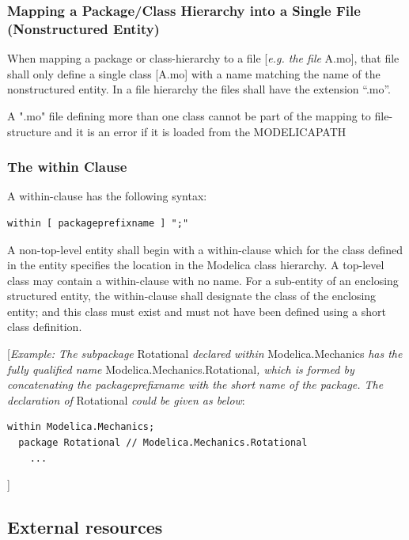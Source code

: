 \documentclass[10pt,a4paper]{report}
\def\doublelabel#1{\label{#1}\hypertarget{#1}{}}
\begin{document}
\subsubsection{Mapping a Package/Class Hierarchy into a Single File (Nonstructured Entity)}\doublelabel{mapping-a-package-class-hierarchy-into-a-single-file-nonstructured-entity}

When mapping a package or class-hierarchy to a file {[}\emph{e.g. the
  file} A.mo{]}, that file shall only define a single class {[}A.mo{]} with a
name matching the name of the nonstructured entity. In a file hierarchy
the files shall have the extension ``.mo''.

A ".mo" file defining more than one class cannot be part of the mapping
to file-structure and it is an error if it is loaded from the
MODELICAPATH

\subsubsection{The within Clause}\doublelabel{the-within-clause}

A within-clause has the following syntax:

\begin{lstlisting}[language=grammar]
  within [ packageprefixname ] ";"
\end{lstlisting}
  A non-top-level entity shall begin with a within-clause which for the
  class defined in the entity specifies the location in the Modelica class
    hierarchy. A top-level class may contain a within-clause with no name.
    For a sub-entity of an enclosing structured entity, the within-clause
shall designate the class of the enclosing entity; and this class must
exist and must not have been defined using a short class definition.

{[}\emph{Example: The subpackage} Rotational \emph{declared within}
Modelica.Mechanics \emph{has the fully qualified name}
Modelica.Mechanics.Rotational\emph{, which is formed by concatenating
the packageprefixname with the short name of the package. The
declaration of} Rotational \emph{could be given as below}:

\begin{lstlisting}[language=modelica]
  within Modelica.Mechanics;
  package Rotational // Modelica.Mechanics.Rotational
    ...
\end{lstlisting}
{]}

\subsection{External resources}\doublelabel{external-resources}
\end{document}
